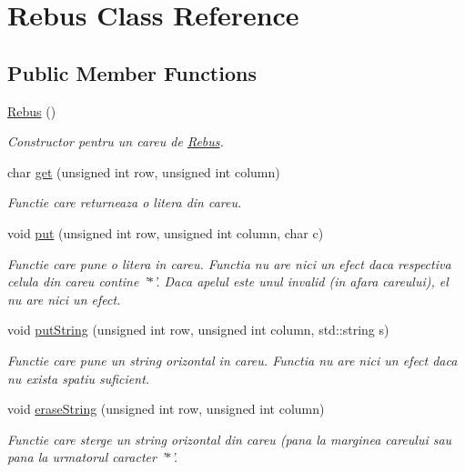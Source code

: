 \hypertarget{classRebus}{
\section{Rebus Class Reference}
\label{classRebus}
}
\subsection*{Public Member Functions}
\begin{DoxyCompactItemize}
\item 
\hyperlink{classRebus_ada84d588bdfa1bd624f4a3bb27ce2c76}{Rebus} ()
\begin{DoxyCompactList}\small\item\em Constructor pentru un careu de \hyperlink{classRebus}{Rebus}. \end{DoxyCompactList}\item 
char \hyperlink{classRebus_a1da48c3c6eccfcfe78285ba3e7395bcc}{get} (unsigned int row, unsigned int column)
\begin{DoxyCompactList}\small\item\em Functie care returneaza o litera din careu. \end{DoxyCompactList}\item 
void \hyperlink{classRebus_ad6dd40d142119027fa581111509a2853}{put} (unsigned int row, unsigned int column, char c)
\begin{DoxyCompactList}\small\item\em Functie care pune o litera in careu. Functia nu are nici un efect daca respectiva celula din careu contine '$\ast$'. Daca apelul este unul invalid (in afara careului), el nu are nici un efect. \end{DoxyCompactList}\item 
void \hyperlink{classRebus_a57b95672c0bf931f1605b18c5cbed815}{putString} (unsigned int row, unsigned int column, std::string s)
\begin{DoxyCompactList}\small\item\em Functie care pune un string orizontal in careu. Functia nu are nici un efect daca nu exista spatiu suficient. \end{DoxyCompactList}\item 
void \hyperlink{classRebus_a3b93d56e569bb72d7825ddebd6e902c9}{eraseString} (unsigned int row, unsigned int column)
\begin{DoxyCompactList}\small\item\em Functie care sterge un string orizontal din careu (pana la marginea careului sau pana la urmatorul caracter '$\ast$'. \end{DoxyCompactList}\item 

\end{DoxyCompactItemize}
